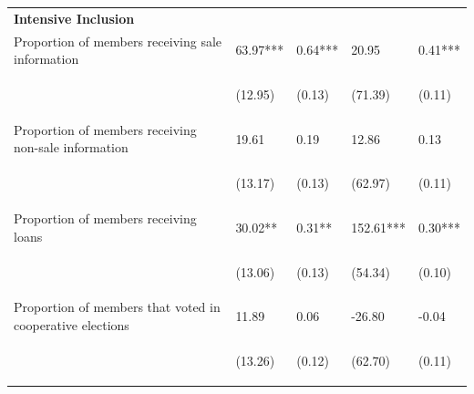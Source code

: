 \documentclass[11pt]{article}
\begin{document}
\begin{table}[H]
{\begin{tabularx}{1.5\linewidth}{lllll}
\textbf{Intensive Inclusion} & & & & \\
\noalign{\smallskip}Proportion of members receiving sale information & 63.97*** & 0.64*** & 20.95 & 0.41***\\
 & \begin{footnotesize}(12.95)\end{footnotesize} & \begin{footnotesize}(0.13)\end{footnotesize} & \begin{footnotesize}(71.39)\end{footnotesize} & \begin{footnotesize}(0.11)\end{footnotesize}\\
\noalign{\smallskip}Proportion of members receiving non-sale information & 19.61 & 0.19 & 12.86 & 0.13\\
 & \begin{footnotesize}(13.17)\end{footnotesize} & \begin{footnotesize}(0.13)\end{footnotesize} & \begin{footnotesize}(62.97)\end{footnotesize} & \begin{footnotesize}(0.11)\end{footnotesize}\\
\noalign{\smallskip}Proportion of members receiving loans & 30.02** & 0.31** & 152.61*** & 0.30***\\
 & \begin{footnotesize}(13.06)\end{footnotesize} & \begin{footnotesize}(0.13)\end{footnotesize} & \begin{footnotesize}(54.34)\end{footnotesize} & \begin{footnotesize}(0.10)\end{footnotesize}\\
\noalign{\smallskip}Proportion of members that voted in cooperative elections & 11.89 & 0.06 & -26.80 & -0.04\\
 & \begin{footnotesize}(13.26)\end{footnotesize} & \begin{footnotesize}(0.12)\end{footnotesize} & \begin{footnotesize}(62.70)\end{footnotesize} & \begin{footnotesize}(0.11)\end{footnotesize}\\

\end{tabularx}}
\end{table}
\end{document}
